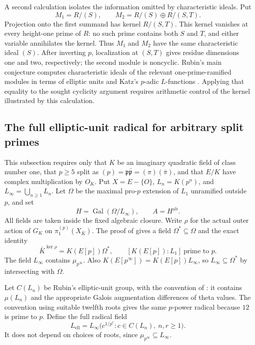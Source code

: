 \documentclass[11pt]{article}
\theoremstyle{definition}\newtheorem{definition}[theorem]{Definition}
\begin{document}
A second calculation isolates the information omitted by
characteristic ideals. Put
\[
 M_1=R/(S),\qquad
 M_2=R/(S)\oplus R/(S,T).
\]
Projection onto the first summand has kernel \(R/(S,T)\).
This kernel vanishes at every height-one prime of \(R\):
no such prime contains both \(S\) and \(T\), and either variable
annihilates the kernel. Thus \(M_1\) and \(M_2\) have the same
characteristic ideal \((S)\). After inverting \(p\), localization
at \((S,T)\) gives residue dimensions one and two, respectively;
the second module is noncyclic. Rubin's main conjecture computes
characteristic ideals of the relevant one-prime-ramified modules
in terms of elliptic units and Katz's \(p\)-adic \(L\)-functions
\cite{Rubin1991}. Applying that equality to the sought cyclicity
argument requires arithmetic control of the kernel illustrated
by this calculation.

\subsection{The full elliptic-unit radical for arbitrary split primes}
\label{subsec:cm-elliptic-radical}

This subsection requires only that \(K\) be an imaginary quadratic field
of class number one, that \(p\geq5\) split as
\((p)=\mathfrak p\bar{\mathfrak p}=(\pi)(\bar\pi)\), and that
\(E/K\) have complex multiplication by \(O_K\).
Put \(X=E-\{O\}\), \(L_n=K(p^n)\), and
\(L_\infty=\bigcup_{n\geq1}L_n\).
Let \(\Omega\) be the maximal pro-\(p\) extension of \(L_1\)
unramified outside \(p\), and set
\[
 H=\operatorname{Gal}(\Omega/L_\infty),\qquad A=H^{\mathrm{ab}}.
\]
All fields are taken inside the fixed algebraic closure.
Write \(\rho\) for the actual outer action of \(G_K\) on
\(\pi_1^{(p)}(X_{\bar K})\).
The proof of \cite[Lemma 2.13, p.~10]{Ishii} gives a field
\(\Omega^*\subseteq\Omega\) and the exact identity
\begin{equation}\label{eq:cm-radical-outer-field}
 \bar K^{\ker\rho}=K(E[p])\Omega^*,\qquad
 [K(E[p]):L_1]\ \text{prime to }p.
\end{equation}
The field \(L_\infty\) contains \(\mu_{p^\infty}\).
Also \(K(E[p^\infty])=K(E[p])L_\infty\), so
\(L_\infty\subseteq\Omega^*\) by intersecting with \(\Omega\).

Let \(C(L_n)\) be Rubin's elliptic-unit group, with the convention of
\cite[Definition 2.2, p.~8]{IshiiSoule}: it contains \(\mu(L_n)\)
and the appropriate Galois augmentation differences of theta values.
The convention using suitable twelfth roots gives the same
\(p\)-power radical because \(12\) is prime to \(p\).
Define the full radical field
\begin{equation}\label{eq:cm-full-radical}
 L_{\mathrm{ell}}=
 L_\infty\bigl(c^{1/p^r}:c\in C(L_n),\ n,r\geq1\bigr).
\end{equation}
It does not depend on choices of roots, since
\(\mu_{p^\infty}\subseteq L_\infty\).
\end{document}
